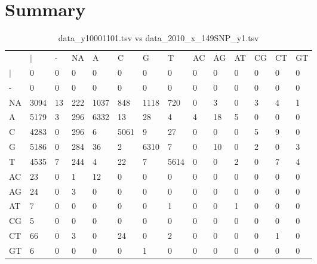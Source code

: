 \section{Summary} \label{section_summary}
\begin{center}
\begin{longtable}{|l|l|l|l|l|l|l|l|l|l|l|l|l|l|}
\caption{data\_y10001101.tsv vs data\_2010\_x\_149SNP\_y1.tsv} \label{table_dm0}\\
\hline
\\
\hline
&$|$&-&NA&A&C&G&T&AC&AG&AT&CG&CT&GT\\
$|$&0&0&0&0&0&0&0&0&0&0&0&0&0\\
-&0&0&0&0&0&0&0&0&0&0&0&0&0\\
NA&3094&13&222&1037&848&1118&720&0&3&0&3&4&1\\
A&5179&3&296&6332&13&28&4&4&18&5&0&0&0\\
C&4283&0&296&6&5061&9&27&0&0&0&5&9&0\\
G&5186&0&284&36&2&6310&7&0&10&0&2&0&3\\
T&4535&7&244&4&22&7&5614&0&0&2&0&7&4\\
AC&23&0&1&12&0&0&0&0&0&0&0&0&0\\
AG&24&0&3&0&0&0&0&0&0&0&0&0&0\\
AT&7&0&0&0&0&0&1&0&0&1&0&0&0\\
CG&5&0&0&0&0&0&0&0&0&0&0&0&0\\
CT&66&0&3&0&24&0&2&0&0&0&0&1&0\\
GT&6&0&0&0&0&1&0&0&0&0&0&0&0\\
\hline
\end{longtable}
\end{center}

